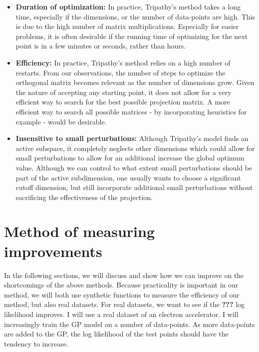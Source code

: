 \begin{itemize}

\item \textbf{Duration of optimization:} In practice, Tripathy's method takes a long time, especially if the dimensions, or the number of data-points are high. This is due to the high number of matrix multiplications. 
Especially for easier problems, it is often desirable if the running time of optimizing for the next point is in a few minutes or seconds, rather than hours.

\item \textbf{Efficiency:} In practice, Tripathy's method relies on a high number of restarts.
From our observations, the number of steps to optimize the orthogonal matrix becomes relevant as the number of dimensions grow.
Given the nature of accepting any starting point, it does not allow for a very efficient way to search for the best possible projection matrix.
A more efficient way to search all possible matrices - by incorporating heuristics for example - would be desirable.

\item \textbf{Insensitive to small perturbations:} Although Tripathy's model finds an active subspace, it completely neglects other dimensions which could allow for small perturbations to allow for an additional increase the global optimum value.
Although we can control to what extent small perturbations should be part of the active subdimension, one usually wants to choose a significant cutoff dimension, but still incorporate additional small perturbations without sacrificing the effectiveness of the projection.

\end{itemize}

\section{Method of measuring improvements}
In the following sections, we will discuss and show how we can improve on the shortcomings of the above methods.
Because practicality is important in our method, we will both use synthetic functions to measure the efficiency of our method, but also real datasets.
For real datasets, we want to see if the
\textbf{???} log likelihood improves.
I will use a real dataset of an electron accelerator.
I will increasingly train the GP model on a number of data-points.
As more data-points are added to the GP, the log likelihood of the test points should have the tendency to increase.\\


